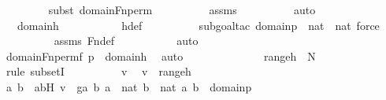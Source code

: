 \begin{isabellebody}
\ \ \ \ \ \ \ \ \isamarkupfalse%
{\isacharparenleft}{\kern0pt}subst\ domain{\isacharunderscore}{\kern0pt}Fn{\isacharunderscore}{\kern0pt}perm{\isacharparenright}{\kern0pt}\isanewline
\ \ \ \ \ \ \ \ \isamarkupfalse%
\ assms\isanewline
\ \ \ \ \ \ \ \ \isamarkupfalse%
\ auto\isanewline
\ \ \ \ \ \ \isamarkupfalse%
\ \isamarkupfalse%
\ {\isachardoublequoteopen}{\isachardot}{\kern0pt}{\isachardot}{\kern0pt}{\isachardot}{\kern0pt}\ {\isacharequal}{\kern0pt}\ domain{\isacharparenleft}{\kern0pt}h{\isacharparenright}{\kern0pt}{\isachardoublequoteclose}\ \isanewline
\ \ \ \ \ \ \ \ \isamarkupfalse%
\ h{\isacharunderscore}{\kern0pt}def\ \isanewline
\ \ \ \ \ \ \ \ \isamarkupfalse%
{\isacharparenleft}{\kern0pt}subgoal{\isacharunderscore}{\kern0pt}tac\ {\isachardoublequoteopen}domain{\isacharparenleft}{\kern0pt}p{\isacharparenright}{\kern0pt}\ {\isasymsubseteq}\ nat\ {\isasymtimes}\ nat{\isachardoublequoteclose}{\isacharcomma}{\kern0pt}\ force{\isacharparenright}{\kern0pt}\isanewline
\ \ \ \ \ \ \ \ \isamarkupfalse%
\ assms\ Fn{\isacharunderscore}{\kern0pt}def\ \isanewline
\ \ \ \ \ \ \ \ \isamarkupfalse%
\ auto\isanewline
\ \ \ \ \ \ \isamarkupfalse%
\ \isamarkupfalse%
\ {\isachardoublequoteopen}domain{\isacharparenleft}{\kern0pt}Fn{\isacharunderscore}{\kern0pt}perm{\isacharparenleft}{\kern0pt}f{\isacharcomma}{\kern0pt}\ p{\isacharparenright}{\kern0pt}{\isacharparenright}{\kern0pt}\ {\isacharequal}{\kern0pt}\ domain{\isacharparenleft}{\kern0pt}h{\isacharparenright}{\kern0pt}{\isachardoublequoteclose}\ \isamarkupfalse%
\ auto\isanewline
\ \ \ \ \isamarkupfalse%
\ \isanewline
\ \ \ \ \ \ \isamarkupfalse%
\ {\isachardoublequoteopen}range{\isacharparenleft}{\kern0pt}h{\isacharparenright}{\kern0pt}\ {\isasymsubseteq}\ N{\isachardoublequoteclose}\ \isanewline
\ \ \ \ \ \ \isamarkupfalse%
\ {\isacharparenleft}{\kern0pt}rule\ subsetI{\isacharparenright}{\kern0pt}\isanewline
\ \ \ \ \ \ \ \ \isamarkupfalse%
\ v\ \isamarkupfalse%
\ {\isachardoublequoteopen}v\ {\isasymin}\ range{\isacharparenleft}{\kern0pt}h{\isacharparenright}{\kern0pt}{\isachardoublequoteclose}\ \isanewline
\ \ \ \ \ \ \ \ \isamarkupfalse%
\ \isamarkupfalse%
\ a\ b\ \ abH{\isacharcolon}{\kern0pt}\ {\isachardoublequoteopen}v\ {\isacharequal}{\kern0pt}\ g{\isacharbackquote}{\kern0pt}{\isacharless}{\kern0pt}a{\isacharcomma}{\kern0pt}\ b{\isachargreater}{\kern0pt}{\isachardoublequoteclose}\ {\isachardoublequoteopen}a\ {\isasymin}\ nat{\isachardoublequoteclose}\ {\isachardoublequoteopen}b\ {\isasymin}\ nat{\isachardoublequoteclose}\ {\isachardoublequoteopen}{\isacharless}{\kern0pt}a{\isacharcomma}{\kern0pt}\ b{\isachargreater}{\kern0pt}\ {\isasymin}\ domain{\isacharparenleft}{\kern0pt}p{\isacharparenright}{\kern0pt}{\isachardoublequoteclose}\ \isanewline

\end{isabellebody}
